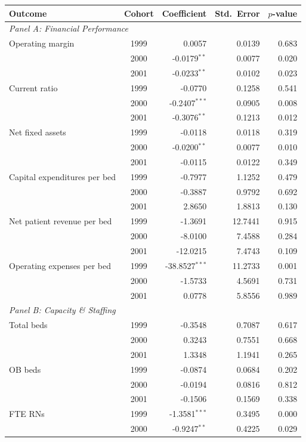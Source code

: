 \begin{tabular}{l c r r r}
\toprule
Outcome & Cohort & Coefficient & Std.\ Error & $p$-value \\
\midrule
\multicolumn{5}{l}{\textit{Panel A: Financial Performance}} \\
Operating margin & 1999 & 0.0057 & 0.0139 & 0.683 \\
 & 2000 & -0.0179$^{**}$ & 0.0077 & 0.020 \\
 & 2001 & -0.0233$^{**}$ & 0.0102 & 0.023 \\
Current ratio & 1999 & -0.0770 & 0.1258 & 0.541 \\
 & 2000 & -0.2407$^{***}$ & 0.0905 & 0.008 \\
 & 2001 & -0.3076$^{**}$ & 0.1213 & 0.012 \\
Net fixed assets & 1999 & -0.0118 & 0.0118 & 0.319 \\
 & 2000 & -0.0200$^{**}$ & 0.0077 & 0.010 \\
 & 2001 & -0.0115 & 0.0122 & 0.349 \\
Capital expenditures per bed & 1999 & -0.7977 & 1.1252 & 0.479 \\
 & 2000 & -0.3887 & 0.9792 & 0.692 \\
 & 2001 & 2.8650 & 1.8813 & 0.130 \\
Net patient revenue per bed & 1999 & -1.3691 & 12.7441 & 0.915 \\
 & 2000 & -8.0100 & 7.4588 & 0.284 \\
 & 2001 & -12.0215 & 7.4743 & 0.109 \\
Operating expenses per bed & 1999 & -38.8527$^{***}$ & 11.2733 & 0.001 \\
 & 2000 & -1.5733 & 4.5691 & 0.731 \\
 & 2001 & 0.0778 & 5.8556 & 0.989 \\
\midrule
\multicolumn{5}{l}{\textit{Panel B: Capacity \& Staffing}} \\
Total beds & 1999 & -0.3548 & 0.7087 & 0.617 \\
 & 2000 & 0.3243 & 0.7551 & 0.668 \\
 & 2001 & 1.3348 & 1.1941 & 0.265 \\
OB beds & 1999 & -0.0874 & 0.0684 & 0.202 \\
 & 2000 & -0.0194 & 0.0816 & 0.812 \\
 & 2001 & -0.1506 & 0.1569 & 0.338 \\
FTE RNs & 1999 & -1.3581$^{***}$ & 0.3495 & 0.000 \\
 & 2000 & -0.9247$^{**}$ & 0.4225 & 0.029 \\

\end{tabular}
